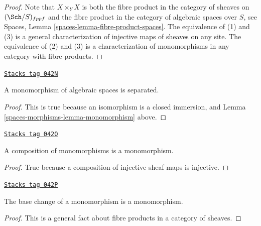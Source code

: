 \begin{proof}
Note that $X \times_Y X$ is both the fibre product in the category of
sheaves on $(\Sch/S)_{fppf}$ and the fibre product in the category
of algebraic spaces over $S$, see
Spaces, Lemma \ref{spaces-lemma-fibre-product-spaces}.
The equivalence of (1) and (3) is a general characterization
of injective maps of sheaves on any site.
The equivalence of (2) and (3) is a characterization of monomorphisms
in any category with fibre products.
\end{proof}

\begin{lemma}
\label{spaces-morphisms-lemma-monomorphism-separated}
\href{https://stacks.math.columbia.edu/tag/042N}{\texttt{Stacks tag 042N}}

A monomorphism of algebraic spaces is separated.
\end{lemma}

\begin{proof}
This is true because an isomorphism is a closed immersion,
and Lemma \ref{spaces-morphisms-lemma-monomorphism} above.
\end{proof}

\begin{lemma}
\label{spaces-morphisms-lemma-composition-monomorphism}
\href{https://stacks.math.columbia.edu/tag/042O}{\texttt{Stacks tag 042O}}

A composition of monomorphisms is a monomorphism.
\end{lemma}

\begin{proof}
True because a composition of injective sheaf maps is injective.
\end{proof}

\begin{lemma}
\label{spaces-morphisms-lemma-base-change-monomorphism}
\href{https://stacks.math.columbia.edu/tag/042P}{\texttt{Stacks tag 042P}}

The base change of a monomorphism is a monomorphism.
\end{lemma}

\begin{proof}
This is a general fact about fibre products in a category of sheaves.
\end{proof}

